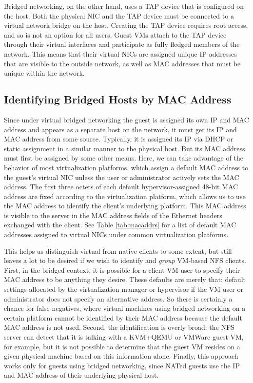 \documentclass[letterpaper,twocolumn,11pt]{article}
\begin{document}
Bridged networking, on the other hand, uses a TAP device that is configured on the host. Both the physical NIC and the TAP device must be connected to a virtual network bridge on the host. Creating the TAP device requires root access, and so is not an option for all users. Guest VMs attach to the TAP device through their virtual interfaces and participate as fully fledged members of the network. This means that their virtual NICs are assigned unique IP addresses that are visible to the outside network, as well as MAC addresses that must be unique within the network.

\subsection{Identifying Bridged Hosts by MAC Address}
\label{subsec:macaddrs}
Since under virtual bridged networking the guest is assigned its own IP and MAC address and appears as a separate host on the network, it must get its IP and MAC address from some source. Typically, it is assigned its IP via DHCP or static assignment in a similar manner to the physical host. But its MAC address must first be assigned by some other means. Here, we can take advantage of the behavior of most virtualization platforms, which assign a default MAC address to the guest's virtual NIC unless the user or administrator actively sets the MAC address. The first three octets of each default hypervisor-assigned 48-bit MAC address are fixed according to the virtualization platform, which allows us to use the MAC address to identify the client's underlying platform. This MAC address is visible to the server in the MAC address fields of the Ethernet headers exchanged with the client. See Table \ref{tab:macaddrs} for a list of default MAC addresses assigned to virtual NICs under common virtualization platforms. 

This helps us distinguish virtual from native clients to some extent, but still leaves a lot to be desired if we wish to identify and \emph{group} VM-based NFS clients. First, in the bridged context, it is possible for a client VM user to specify their MAC address to be anything they desire. These defaults are merely that: default settings allocated by the virtualization manager or hypervisor if the VM user or administrator does not specify an alternative address. So there is certainly a chance for false negatives, where virtual machines using bridged networking on a certain platform cannot be identified by their MAC address because the default MAC address is not used. Second, the identification is overly broad: the NFS server can detect that it is talking with a KVM+QEMU or VMWare guest VM, for example, but it is not possible to determine that the guest VM resides on a given physical machine based on this information alone. Finally, this approach works only for guests using bridged networking, since NATed guests use the IP and MAC address of their underlying physical host.
\end{document}
